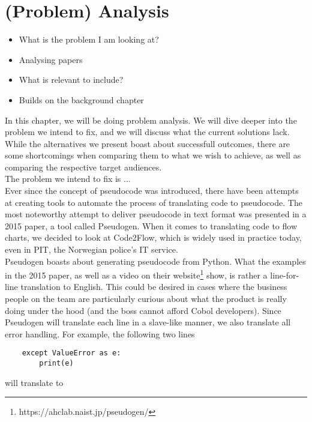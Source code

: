 \chapter{(Problem) Analysis}
\begin{itemize}
    \item What is the problem I am looking at?
    \item Analysing papers
    \item What is relevant to include?
    \item Builds on the background chapter
\end{itemize}

In this chapter, we will be doing problem analysis. We will dive deeper into the problem we intend to fix, and we will discuss what the current solutions lack. While the alternatives we present boast about successfull outcomes, there are some shortcomings when comparing them to what we wish to achieve, as well as comparing the respective target audiences. \hfill \\

The problem we intend to fix is ... \hfill \\

Ever since the concept of pseudocode was introduced, there have been attempts at creating tools to automate the process of translating code to pseudocode. The most noteworthy attempt to deliver pseudocode in text format was presented in a 2015 paper, a tool called Pseudogen. When it comes to translating code to flow charts, we decided to look at Code2Flow, which is widely used in practice today, even in PIT, the Norwegian police's IT service. \hfill \\

Pseudogen boasts about generating pseudocode from Python. What the examples in the 2015 paper, as well as a video on their website\footnote{https://ahclab.naist.jp/pseudogen/} show, is rather a line-for-line translation to English. This could be desired in cases where the business people on the team are particularly curious about what the product is really doing under the hood (and the boss cannot afford Cobol developers). Since Pseudogen will translate each line in a slave-like manner, we also translate all error handling. For example, the following two lines

\begin{verbatim}
    except ValueError as e:
        print(e)
\end{verbatim}

will translate to

